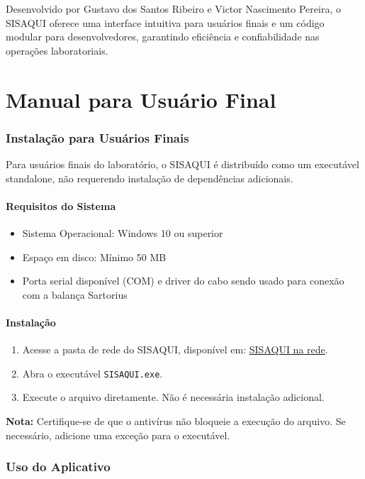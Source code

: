 \documentclass[12pt,a4paper]{article}
\begin{document}
Desenvolvido por Gustavo dos Santos Ribeiro e Victor Nascimento Pereira, o SISAQUI oferece uma interface intuitiva para usuários finais e um código modular para desenvolvedores, garantindo eficiência e confiabilidade nas operações laboratoriais.

\part{Manual para Usuário Final}

\section{Instalação para Usuários Finais}
Para usuários finais do laboratório, o SISAQUI é distribuído como um executável standalone, não requerendo instalação de dependências adicionais.

\subsection{Requisitos do Sistema}

\begin{itemize}
\item Sistema Operacional: Windows 10 ou superior
\item Espaço em disco: Mínimo 50 MB
\item Porta serial disponível (COM) e driver do cabo sendo usado para conexão com a balança Sartorius
\end{itemize}

\subsection{Instalação}
\begin{enumerate}
\item Acesse a pasta de rede do SISAQUI, disponível em: \href{run:I:/LMM/Documentos_e_Registros_da_Qualidade_LMM/Sistema_de_Gestao/Softwares/SISAQUI}{SISAQUI na rede}.
\item Abra o executável \texttt{SISAQUI.exe}.
\item Execute o arquivo diretamente. Não é necessária instalação adicional.
\end{enumerate}

\textbf{Nota:} Certifique-se de que o antivírus não bloqueie a execução do arquivo. Se necessário, adicione uma exceção para o executável.

\section{Uso do Aplicativo}
\end{document}
